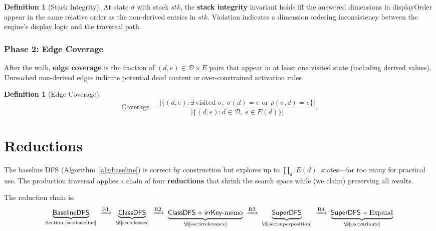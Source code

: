 \documentclass[11pt]{article}
\theoremstyle{definition}
\newtheorem{definition}[theorem]{Definition}
\newcommand{\Dim}{\mathcal{D}}         %
\newcommand{\Edg}[1]{E(#1)}            %
\newcommand{\sel}{\sigma}              %
\newcommand{\res}[2]{\rho(#1,#2)}      %
\newcommand{\ik}{\mathsf{irrKey}}      %
\begin{document}
\begin{definition}[Stack Integrity]\label{def:stackint}
At state $\sel$ with stack $\mathit{stk}$, the \textbf{stack integrity}
invariant holds iff the answered dimensions in \textsf{displayOrder}
appear in the same relative order as the non-derived entries in
$\mathit{stk}$. Violation indicates a dimension ordering inconsistency
between the engine's display logic and the traversal path.
\end{definition}

\subsubsection{Phase 2: Edge Coverage}\label{sec:coverage}

After the walk, \textbf{edge coverage} is the fraction of
$(d,e) \in \Dim \times E$ pairs that appear in at least one visited
state (including derived values). Unreached non-derived edges indicate
potential dead content or over-constrained activation rules.

\begin{definition}[Edge Coverage]\label{def:edgecov}
\[
  \mathrm{Coverage} =
  \frac{|\{(d,e) : \exists\,\text{visited } \sel,\;
         \sel(d) = e \text{ or } \res{\sel}{d} = e\}|}
       {|\{(d,e) : d \in \Dim,\; e \in \Edg{d}\}|}.
\]
\end{definition}


\section{Reductions}\label{sec:reductions}

The baseline DFS (Algorithm~\ref{alg:baseline}) is correct by
construction but explores up to $\prod_{d} |\Edg{d}|$ states---far too
many for practical use. The production traversal applies a chain of four
\textbf{reductions} that shrink the search space while (we claim)
preserving all results.

The reduction chain is:
\[
  \underbrace{\textsf{BaselineDFS}}_{\text{Section~\ref{sec:baseline}}}
  \;\xrightarrow{\text{R1}}\;
  \underbrace{\textsf{ClassDFS}}_{\text{\S\ref{sec:classes}}}
  \;\xrightarrow{\text{R2}}\;
  \underbrace{\textsf{ClassDFS} + \ik\text{-memo}}_{\text{\S\ref{sec:irrelevance}}}
  \;\xrightarrow{\text{R3}}\;
  \underbrace{\textsf{SuperDFS}}_{\text{\S\ref{sec:superposition}}}
  \;\xrightarrow{\text{R4}}\;
  \underbrace{\textsf{SuperDFS} + \text{Expand}}_{\text{\S\ref{sec:variants}}}
\]
\end{document}
